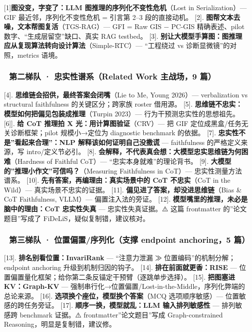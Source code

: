 \documentclass[
  11pt,
]{article}
\begin{document}
{[}1{]}\textbf{图没变，字变了：LLM 图推理的序列化不变性危机}（Lost in
Serialization）--- GIF 最近邻，序列化不变性危机 = 引言第 2--3
段的直接动机。 {[}2{]}.
\textbf{图帮文本去噪，文本帮图复活}（TGS-RAG）--- GFI = Raw GIS − PC-GIS
精确表述、pilot 数字、``生成层留空''缺口、真实 RAG testbed。 {[}3{]}.
\textbf{别让大模型手算图：图推理应从复现算法转向设计算法}（Simple-RTC）---
``工程绕过 vs 诊断显微镜''的对照，metrics 语境。

\subsubsection{🔬 第二梯队 · 忠实性谱系（Related Work 主战场，9
篇）}\label{ux7b2cux4e8cux68afux961f-ux5fe0ux5b9eux6027ux8c31ux7cfbrelated-work-ux4e3bux6218ux573a9-ux7bc7}

{[}4{]}. \textbf{思维链会招供，最终答案会闭嘴}（Lie to Me, Young
2026）--- verbalization vs structural faithfulness 的关键区分；跨家族
roster 借用源。 {[}5{]}.
\textbf{思维链不忠实：模型如何把偏见包装成推理}（Turpin 2023）---
行为干预测忠实性的思想祖先。 {[}6{]}{]}. \textbf{给 CoT 推理拍 X
光：用计算图验证}（CRV）--- 把 GIF 定位成黑盒/任务无关诊断框架；pilot
规模小→定位为 diagnostic benchmark 的依据。 {[}7{]}.
\textbf{忠实性不是''看起来合理''：NLP 解释该如何证明自己没撒谎} ---
faithfulness 的严格定义来源，写 intro/定义节必引。 {[}8{]}.
\textbf{会解释，不代表真会想：大模型忠实思维链为何困难}（Hardness of
Faithful CoT）--- ``忠实本身就难''的理论背书。 {[}9{]}.
\textbf{大模型的''推理小作文''可信吗？}（Measuring Faithfulness in
CoT）--- 忠实性测量方法谱系。 {[}10{]}.
\textbf{先有答案，再编理由：真实场景中的 CoT 不忠实}（CoT in the
Wild）--- 真实场景不忠实的证据。 {[}11{]}.
\textbf{偏见进了答案，却没进思维链}（Bias \& CoT Faithfulness, VLLM）---
偏置注入法的旁证。 {[}12{]}.
\textbf{模型嘴里的推理，未必是脑中的理由：CoT 忠实性失真} ---
忠实性失真证据。⚠️ 这篇 frontmatter 的''论文题目''写成了
FiDeLiS，疑似复制错，建议核对。

\subsubsection{📍 第三梯队 · 位置偏置/序列化（支撑 endpoint anchoring，5
篇）}\label{ux7b2cux4e09ux68afux961f-ux4f4dux7f6eux504fux7f6eux5e8fux5217ux5316ux652fux6491-endpoint-anchoring5-ux7bc7}

{[}13{]}. \textbf{排名别看位置：InvariRank} --- ``注意力泄漏 ≫
位置编码''的机制分解；endpoint anchoring 升级到机制归因的钩子。
{[}14{]}. \textbf{排在前面就更香：RISE} ---
位置偏置量化框架；给你第二条反锚定干预臂（逐跳单步选择）。 {[}15{]}.
\textbf{把图塞进 KV：Graph-KV} ---
强制串行化→位置偏置/Lost-in-the-Middle，序列化弊端的总论来源。 {[}16{]}.
\textbf{选项换个座位，模型换个答案}（MCQ 选项顺序敏感）---
位置敏感的跨任务旁证。 {[}17{]}. \textbf{顺序一换，模型就乱：LLM
输入排列敏感性} --- 排列敏感跨 benchmark 证据。⚠️
frontmatter''论文题目''写成 Graph-constrained
Reasoning，明显是复制错，建议修。
\end{document}
